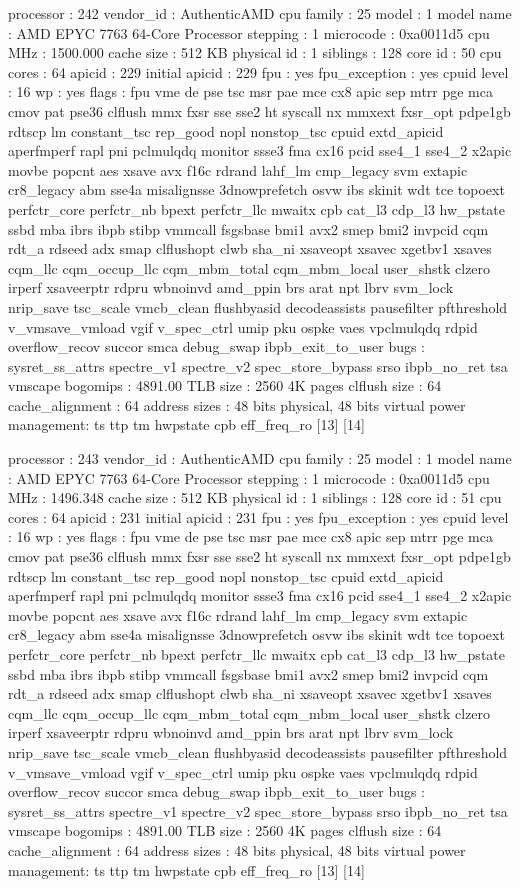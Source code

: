 processor	: 242
vendor_id	: AuthenticAMD
cpu family	: 25
model		: 1
model name	: AMD EPYC 7763 64-Core Processor
stepping	: 1
microcode	: 0xa0011d5
cpu MHz		: 1500.000
cache size	: 512 KB
physical id	: 1
siblings	: 128
core id		: 50
cpu cores	: 64
apicid		: 229
initial apicid	: 229
fpu		: yes
fpu_exception	: yes
cpuid level	: 16
wp		: yes
flags		: fpu vme de pse tsc msr pae mce cx8 apic sep mtrr pge mca cmov pat pse36 clflush mmx fxsr sse sse2 ht syscall nx mmxext fxsr_opt pdpe1gb rdtscp lm constant_tsc rep_good nopl nonstop_tsc cpuid extd_apicid aperfmperf rapl pni pclmulqdq monitor ssse3 fma cx16 pcid sse4_1 sse4_2 x2apic movbe popcnt aes xsave avx f16c rdrand lahf_lm cmp_legacy svm extapic cr8_legacy abm sse4a misalignsse 3dnowprefetch osvw ibs skinit wdt tce topoext perfctr_core perfctr_nb bpext perfctr_llc mwaitx cpb cat_l3 cdp_l3 hw_pstate ssbd mba ibrs ibpb stibp vmmcall fsgsbase bmi1 avx2 smep bmi2 invpcid cqm rdt_a rdseed adx smap clflushopt clwb sha_ni xsaveopt xsavec xgetbv1 xsaves cqm_llc cqm_occup_llc cqm_mbm_total cqm_mbm_local user_shstk clzero irperf xsaveerptr rdpru wbnoinvd amd_ppin brs arat npt lbrv svm_lock nrip_save tsc_scale vmcb_clean flushbyasid decodeassists pausefilter pfthreshold v_vmsave_vmload vgif v_spec_ctrl umip pku ospke vaes vpclmulqdq rdpid overflow_recov succor smca debug_swap ibpb_exit_to_user
bugs		: sysret_ss_attrs spectre_v1 spectre_v2 spec_store_bypass srso ibpb_no_ret tsa vmscape
bogomips	: 4891.00
TLB size	: 2560 4K pages
clflush size	: 64
cache_alignment	: 64
address sizes	: 48 bits physical, 48 bits virtual
power management: ts ttp tm hwpstate cpb eff_freq_ro [13] [14]

processor	: 243
vendor_id	: AuthenticAMD
cpu family	: 25
model		: 1
model name	: AMD EPYC 7763 64-Core Processor
stepping	: 1
microcode	: 0xa0011d5
cpu MHz		: 1496.348
cache size	: 512 KB
physical id	: 1
siblings	: 128
core id		: 51
cpu cores	: 64
apicid		: 231
initial apicid	: 231
fpu		: yes
fpu_exception	: yes
cpuid level	: 16
wp		: yes
flags		: fpu vme de pse tsc msr pae mce cx8 apic sep mtrr pge mca cmov pat pse36 clflush mmx fxsr sse sse2 ht syscall nx mmxext fxsr_opt pdpe1gb rdtscp lm constant_tsc rep_good nopl nonstop_tsc cpuid extd_apicid aperfmperf rapl pni pclmulqdq monitor ssse3 fma cx16 pcid sse4_1 sse4_2 x2apic movbe popcnt aes xsave avx f16c rdrand lahf_lm cmp_legacy svm extapic cr8_legacy abm sse4a misalignsse 3dnowprefetch osvw ibs skinit wdt tce topoext perfctr_core perfctr_nb bpext perfctr_llc mwaitx cpb cat_l3 cdp_l3 hw_pstate ssbd mba ibrs ibpb stibp vmmcall fsgsbase bmi1 avx2 smep bmi2 invpcid cqm rdt_a rdseed adx smap clflushopt clwb sha_ni xsaveopt xsavec xgetbv1 xsaves cqm_llc cqm_occup_llc cqm_mbm_total cqm_mbm_local user_shstk clzero irperf xsaveerptr rdpru wbnoinvd amd_ppin brs arat npt lbrv svm_lock nrip_save tsc_scale vmcb_clean flushbyasid decodeassists pausefilter pfthreshold v_vmsave_vmload vgif v_spec_ctrl umip pku ospke vaes vpclmulqdq rdpid overflow_recov succor smca debug_swap ibpb_exit_to_user
bugs		: sysret_ss_attrs spectre_v1 spectre_v2 spec_store_bypass srso ibpb_no_ret tsa vmscape
bogomips	: 4891.00
TLB size	: 2560 4K pages
clflush size	: 64
cache_alignment	: 64
address sizes	: 48 bits physical, 48 bits virtual
power management: ts ttp tm hwpstate cpb eff_freq_ro [13] [14]

